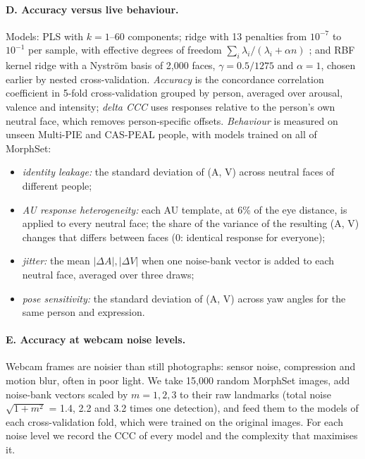 \documentclass[11pt,a4paper]{article}
\begin{document}
\paragraph{D. Accuracy versus live behaviour.} Models: PLS with $k = 1$--60 components; ridge with 13
penalties from $10^{-7}$ to $10^{-1}$ per sample, with effective degrees of freedom
$\sum_i \lambda_i/(\lambda_i + \alpha n)$ \citep{hastie2009elements}; and RBF kernel ridge with a
Nystr\"om basis of 2,000 faces, $\gamma = 0.5/1275$ and $\alpha = 1$, chosen earlier by nested
cross-validation. \emph{Accuracy} is the concordance correlation coefficient
\citep[CCC;][]{lin1989concordance} in 5-fold cross-validation grouped by person, averaged over
arousal, valence and intensity; \emph{delta CCC} uses responses relative to the person's own
neutral face, which removes person-specific offsets. \emph{Behaviour} is measured on unseen
Multi-PIE and CAS-PEAL people, with models trained on all of MorphSet:
\begin{itemize}
  \item \emph{identity leakage:} the standard deviation of (A, V) across neutral faces of
  different people;
  \item \emph{AU response heterogeneity:} each AU template, at 6\% of the eye distance, is applied
  to every neutral face; the share of the variance of the resulting (A, V) changes that differs
  between faces (0: identical response for everyone);
  \item \emph{jitter:} the mean $|\Delta A|, |\Delta V|$ when one noise-bank vector is added to each
  neutral face, averaged over three draws;
  \item \emph{pose sensitivity:} the standard deviation of (A, V) across yaw angles for the same
  person and expression.
\end{itemize}

\paragraph{E. Accuracy at webcam noise levels.} Webcam frames are noisier than still photographs:
sensor noise, compression and motion blur, often in poor light. We take 15,000 random MorphSet
images, add noise-bank vectors scaled by $m = 1, 2, 3$ to their raw landmarks (total noise
$\sqrt{1+m^2}$ = 1.4, 2.2 and 3.2 times one detection), and feed them to the models of each
cross-validation fold, which were trained on the original images. For each noise level we record
the CCC of every model and the complexity that maximises it.
\end{document}
